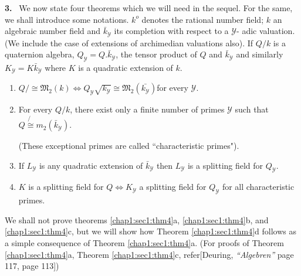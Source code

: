 \textbf{3.}~ We now state four theorems which we will need in the
  sequel. For the same, we shall introduce some notations. $k^o$
  denotes the rational number field; $k$ an algebraic number field and
  $\bar{k}_{\mathscr{Y}}$ its completion with respect to a
  $\mathscr{Y}$- adic valuation. (We include the case of extensions of
  archimedian valuations also). If $Q/k$ is a quaternion algebra,
  $Q_{\mathscr{Y}}= Q.\bar{k}_{\mathscr{Y}}$, the tensor product of
  $Q$ and $\bar{k}_{\mathscr{Y}}$ and similarly $K_{\mathscr{Y}} = K
  \bar{k}_{\mathscr{Y}}$ where $K$ is a quadratic extension of $k$. 

\begin{theorem}\label{chap1:sec1:thm4} %
  \begin{enumerate}[\rm a)]
  \item  $Q/ \cong \mathfrak{M}_2 (k) \Longleftrightarrow Q_{\mathscr{Y}}
    \sqrt{k_{\mathscr{Y}}} \cong \mathfrak{M}_2
    (\bar{k_{\mathscr{Y}}})$\pageoriginale for every $\mathscr{Y}$. 
  \item For every $Q /k$, there exist only a finite number of
    primes $\mathscr{Y}$ such that $Q\not{\cong} m_2
    (\bar{k}_{\mathscr{Y}})$.  

    (These exceptional primes are called ``characteristic primes").
  \item If $L_{\mathscr{Y}}$ is any quadratic extension of
    $\bar{k}_{\mathscr{Y}}$ then $L_{\mathscr{Y}}$ is a splitting field
    for $Q_{\mathscr{Y}}$. 
  \item $K$ is a splitting field for $Q \Longleftrightarrow
    K_{\mathscr{Y}}$ a splitting field for $Q_{\mathscr{Y}}$ for all
    characteristic primes. 
  \end{enumerate}
\end{theorem}

We shall not prove theorems \ref{chap1:sec1:thm4}a, \ref{chap1:sec1:thm4}b, and \ref{chap1:sec1:thm4}c, but we will show how
Theorem  \ref{chap1:sec1:thm4}d follows as a simple consequence of
Theorem \ref{chap1:sec1:thm4}a.  (For 
proofs of Theorem \ref{chap1:sec1:thm4}a, Theorem
\ref{chap1:sec1:thm4}c, refer[Deuring, \textit{ 
``Algebren''} page 117, page 113]) 

